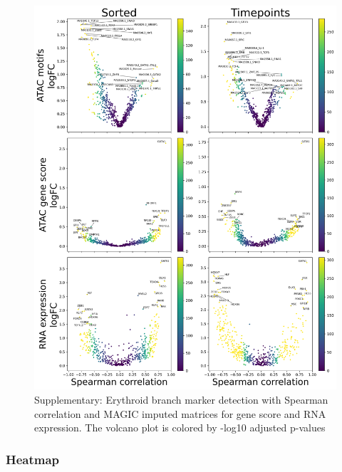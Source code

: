 \documentclass[a4paper]{article}
\begin{document}
\begin{figure}[!htb]
  \centering
  \includegraphics[width=\textwidth]{../figures/hematopoiesis/MKP_40_110_smooth_magic_single_branch_volcanos_motifs.png}
  \caption{Supplementary: Erythroid branch marker detection with Spearman correlation and MAGIC imputed matrices for gene score and RNA expression. The volcano plot is colored by -log10 adjusted p-values}
\end{figure}

\FloatBarrier
\subsubsection{Heatmap}
\end{document}
